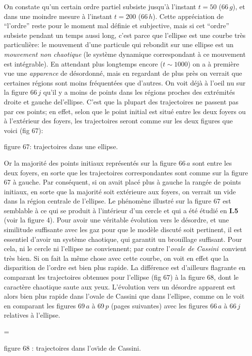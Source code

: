 On constate qu'un certain ordre partiel subsiste jusqu'\`a
l'instant $t=50$ ($66\, g$), et dans une moindre mesure \`a l'instant
$t=200$ ($66\, h$). Cette appr\'eciation de ``l'ordre'' reste pour le
moment mal d\'efinie et subjective, mais si cet ``ordre''
subsiste pendant un temps aussi long, c'est parce que l'ellipse est une
courbe tr\`es particuli\`ere: le mouvement d'une particule qui rebondit
sur une ellipse est un {\it mouvement non chaotique} (le syst\`eme
dynamique correspondant \`a ce mouvement est int\'egrable). En attendant
plus longtemps encore ($t \sim 1000$) on a \`a premi\`ere vue une
{\it apparence} de d\'esordonn\'e, mais en regardant de plus pr\`es
on verrait que certaines r\'egions sont moins fr\'equent\'ees que d'autres.
On voit d\'ej\`a \`a l'oeil nu sur la figure $66\, j$ qu'il y a moins de 
points
dans les r\'egions proches des extr\'emit\'es droite et gauche del'ellipse.
C'est que la plupart des trajectoires ne passent pas par ces points; en
effet, selon que le point initial est situ\'e entre les deux foyers
ou \`a l'ext\'erieur des
foyers, les trajectoires seront comme sur les deux figures que voici (fig 67):
\medskip
{}
\centerline{\eightrm figure 67: trajectoires dans une ellipse.}
\medskip
\midinsert
{}
\vskip4mm
\endinsert
\medskip
Or la majorit\'e des points initiaux repr\'esent\'es
sur la figure $66\, a$ sont entre les deux foyers, en sorte que les
trajectoires correspondantes sont comme sur la figure 67 \`a gauche. 
\medskip
Par cons\'equent, si on avait plac\'e plus \`a gauche la rang\'ee de points
initiaux, en sorte que la majorit\'e soit ext\'erieure aux foyers,
on verrait un vide dans la r\'egion centrale de l'ellipse.
\medskip
Le ph\'enom\`ene illustr\'e sur la figure 67 est semblable
\`a ce qui se produit \`a l'int\'erieur d'un cercle et qui a 
\'et\'e \'etudi\'e en {\bf I.5} (voir la figure 4).
\medskip
Pour avoir une v\'eritable \'evolution vers le
d\'esordre, et une similitude suffisante avec les gaz pour que le mod\`ele
discut\'e soit pertinent, il est essentiel d'avoir un syst\`eme
chaotique, qui garantit un brouillage suffisant. Pour cela, ni le cercle ni
l'ellipse ne conviennent; par contre l'{\it ovale de Cassini}\  convient
tr\`es bien. Si on fait la m\^eme chose avec cette courbe, on voit en effet
que la disparition de l'ordre est bien plus rapide. La diff\'erence est
d'ailleurs flagrante en comparant les trajectoires obtenues pour
l'ellipse (fig 67) \`a la figure 68,
dont le caract\`ere chaotique saute aux yeux. L'\'evolution
vers un d\'esordre apparent est alors bien plus rapide dans l'ovale
de Cassini que dans l'ellipse, comme on le voit en comparant les figures
$69\, a$ \`a $69\, p$ (pages suivantes) avec les figures $66\, a$ \`a 
$66\, j$ 
relatives \`a l'ellipse.
\midinsert
\centerline{\epsfxsize=\hsize
{}}
\centerline{\eightrm figure 68 : trajectoires dans l'ov{\"\i}de de Cassini.}
\vskip3mm
\endinsert

